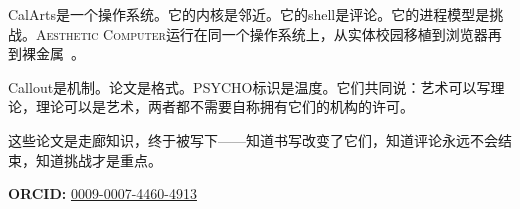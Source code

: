 \documentclass[10pt,letterpaper,twocolumn]{article}
\newcommand{\ac}{\textsc{Aesthetic Computer}}
\begin{document}
CalArts是一个操作系统。它的内核是邻近。它的shell是评论。它的进程模型是挑战。\ac{}运行在同一个操作系统上，从实体校园移植到浏览器再到裸金属~\citep{scudder2026ac, scudder2026os}。

Callout是机制。论文是格式。PSYCHO标识是温度。它们共同说：艺术可以写理论，理论可以是艺术，两者都不需要自称拥有它们的机构的许可。

这些论文是走廊知识，终于被写下——知道书写改变了它们，知道评论永远不会结束，知道挑战才是重点。

\vspace{0.5em}
\noindent\textbf{ORCID:} \href{https://orcid.org/0009-0007-4460-4913}{0009-0007-4460-4913}



\end{document}
